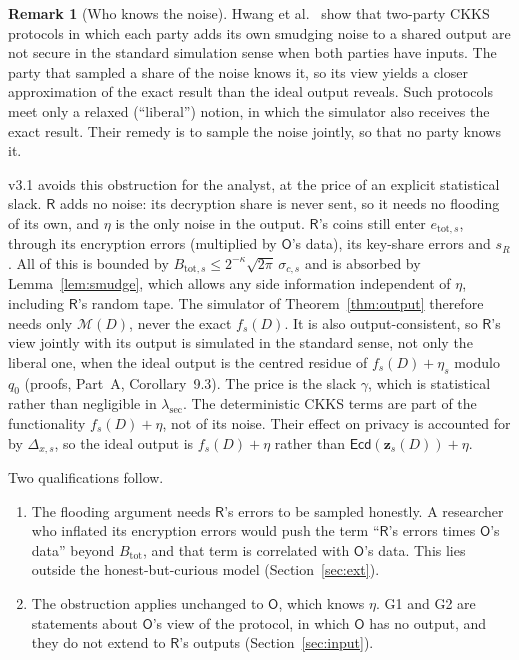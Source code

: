 \documentclass[11pt]{article}
\theoremstyle{definition}
\newtheorem{remark}{Remark}[section]
\theoremstyle{plain}
\newcommand{\Ecd}{\mathsf{Ecd}}
\newcommand{\Party}[1]{\textsf{#1}}
\newcommand{\Rp}{\Party{R}}
\newcommand{\Op}{\Party{O}}
\begin{document}
\begin{remark}[Who knows the noise]
\label{rem:whoknows}
Hwang et al.~\cite{hwang2025insecurity} show that two-party CKKS protocols in which each party adds its own smudging noise to a shared output are not secure in the standard simulation sense when both parties have inputs. The party that sampled a share of the noise knows it, so its view yields a closer approximation of the exact result than the ideal output reveals. Such protocols meet only a relaxed (``liberal'') notion, in which the simulator also receives the exact result. Their remedy is to sample the noise jointly, so that no party knows it.

v3.1 avoids this obstruction for the analyst, at the price of an explicit statistical slack. $\Rp$ adds no noise: its decryption share is never sent, so it needs no flooding of its own, and $\eta$ is the only noise in the output. $\Rp$'s coins still enter $e_{\mathrm{tot},s}$, through its encryption errors (multiplied by $\Op$'s data), its key-share errors and $s_R$. All of this is bounded by $B_{\mathrm{tot},s} \le 2^{-\kappa}\sqrt{2\pi}\,\sigma_{c,s}$ and is absorbed by Lemma~\ref{lem:smudge}, which allows any side information independent of $\eta$, including $\Rp$'s random tape. The simulator of Theorem~\ref{thm:output} therefore needs only $\mathcal M(D)$, never the exact $f_s(D)$. It is also output-consistent, so $\Rp$'s view jointly with its output is simulated in the standard sense, not only the liberal one, when the ideal output is the centred residue of $f_s(D) + \eta_s$ modulo $q_0$ (proofs, Part~A, Corollary~9.3). The price is the slack $\gamma$, which is statistical rather than negligible in $\lambda_{\mathrm{sec}}$. The deterministic CKKS terms are part of the functionality $f_s(D) + \eta$, not of its noise. Their effect on privacy is accounted for by $\Delta_{x,s}$, so the ideal output is $f_s(D) + \eta$ rather than $\Ecd(\mathbf z_s(D)) + \eta$.

Two qualifications follow.
\begin{enumerate}[noitemsep, label=(\roman*)]
  \item The flooding argument needs $\Rp$'s errors to be sampled honestly. A researcher who inflated its encryption errors would push the term ``$\Rp$'s errors times $\Op$'s data'' beyond $B_{\mathrm{tot}}$, and that term is correlated with $\Op$'s data. This lies outside the honest-but-curious model (Section~\ref{sec:ext}).
  \item The obstruction applies unchanged to $\Op$, which knows $\eta$. G1 and G2 are statements about $\Op$'s view of the protocol, in which $\Op$ has no output, and they do not extend to $\Rp$'s outputs (Section~\ref{sec:input}).
\end{enumerate}
\end{remark}
\end{document}
